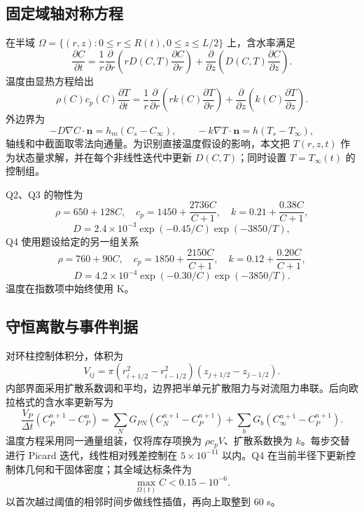 \documentclass[withoutpreface,bwprint]{cumcmthesis}
\begin{document}
\subsection{固定域轴对称方程}
在半域 $\Omega=\{(r,z):0\le r\le R(t),0\le z\le L/2\}$ 上，含水率满足
\begin{equation}
\frac{\partial C}{\partial t}=\frac1r\frac{\partial}{\partial r}\left(rD(C,T)\frac{\partial C}{\partial r}\right)+\frac{\partial}{\partial z}\left(D(C,T)\frac{\partial C}{\partial z}\right).
\label{eq:mass}
\end{equation}
温度由显热方程给出
\begin{equation}
\rho(C)c_p(C)\frac{\partial T}{\partial t}=\frac1r\frac{\partial}{\partial r}\left(rk(C)\frac{\partial T}{\partial r}\right)+\frac{\partial}{\partial z}\left(k(C)\frac{\partial T}{\partial z}\right).
\label{eq:heat}
\end{equation}
外边界为
\begin{equation}
-D\nabla C\cdot\boldsymbol n=h_m(C_s-C_\infty),\qquad -k\nabla T\cdot\boldsymbol n=h(T_s-T_\infty),
\label{eq:robin}
\end{equation}
轴线和中截面取零法向通量。为识别直接温度假设的影响，本文把 $T(r,z,t)$ 作为状态量求解，并在每个非线性迭代中更新 $D(C,T)$；同时设置 $T=T_\infty(t)$ 的控制组。

Q2、Q3 的物性为
\begin{equation}
\rho=650+128C,\quad c_p=1450+\frac{2736C}{C+1},\quad k=0.21+\frac{0.38C}{C+1},
\end{equation}
\begin{equation}
D=2.4\times10^{-3}\exp(-0.45/C)\exp(-3850/T),
\label{eq:q23}
\end{equation}
Q4 使用题设给定的另一组关系
\begin{equation}
\rho=760+90C,\quad c_p=1850+\frac{2150C}{C+1},\quad k=0.12+\frac{0.20C}{C+1},
\end{equation}
\begin{equation}
D=4.2\times10^{-4}\exp(-0.30/C)\exp(-3850/T).
\label{eq:q4}
\end{equation}
温度在指数项中始终使用 K。

\subsection{守恒离散与事件判据}
对环柱控制体积分，体积为
\begin{equation}
V_{ij}=\pi(r_{i+1/2}^2-r_{i-1/2}^2)(z_{j+1/2}-z_{j-1/2}).
\end{equation}
内部界面采用扩散系数调和平均，边界把半单元扩散阻力与对流阻力串联。后向欧拉格式的含水率更新写为
\begin{equation}
\frac{V_P}{\Delta t}(C_P^{n+1}-C_P^n)=\sum_NG_{PN}(C_N^{n+1}-C_P^{n+1})+\sum_bG_b(C_\infty^{n+1}-C_P^{n+1}).
\label{eq:fv}
\end{equation}
温度方程采用同一通量组装，仅将库存项换为 $\rho c_pV$、扩散系数换为 $k$。每步交替进行 Picard 迭代，线性相对残差控制在 $5\times10^{-11}$ 以内。Q4 在当前半径下更新控制体几何和干固体密度；其全域达标条件为
\begin{equation}
\max_{\Omega(t)}C<0.15-10^{-6}.
\label{eq:event}
\end{equation}
以首次越过阈值的相邻时间步做线性插值，再向上取整到 60 s。
\end{document}
